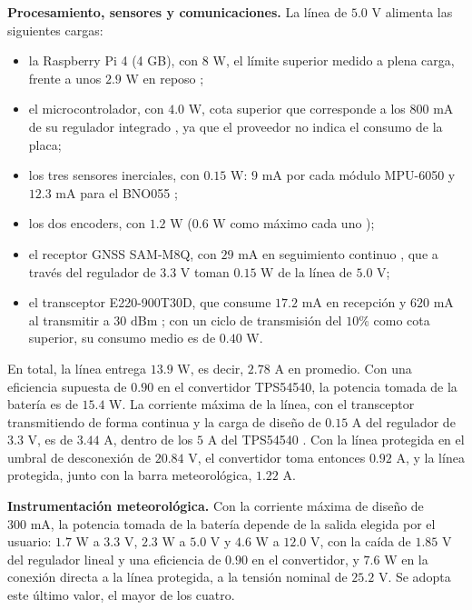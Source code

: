 \documentclass[../../General.tex]{subfiles}
\begin{document}
\textbf{Procesamiento, sensores y comunicaciones.} La línea de $5.0\text{ V}$ alimenta las siguientes cargas:
\begin{itemize}
    \item la Raspberry Pi 4 (4 GB), con $8\text{ W}$, el límite superior medido a plena carga, frente a unos $2.9\text{ W}$ en reposo \citep{raspberrytips_power};
    \item el microcontrolador, con $4.0\text{ W}$, cota superior que corresponde a los $800\text{ mA}$ de su regulador integrado \citep{naylamp_mega2560}, ya que el proveedor no indica el consumo de la placa;
    \item los tres sensores inerciales, con $0.15\text{ W}$: $9\text{ mA}$ por cada módulo MPU-6050 \citep{gy521_mpu6050} y $12.3\text{ mA}$ para el BNO055 \citep{bosch_bno055};
    \item los dos encoders, con $1.2\text{ W}$ ($0.6\text{ W}$ como máximo cada uno \citep{omron_e6b2});
    \item el receptor GNSS SAM-M8Q, con $29\text{ mA}$ en seguimiento continuo \citep{ublox_samm8q}, que a través del regulador de $3.3\text{ V}$ toman $0.15\text{ W}$ de la línea de $5.0\text{ V}$;
    \item el transceptor E220-900T30D, que consume $17.2\text{ mA}$ en recepción y $620\text{ mA}$ al transmitir a $30\text{ dBm}$ \citep{ebyte_e220_900t30d}; con un ciclo de transmisión del $10\%$ como cota superior, su consumo medio es de $0.40\text{ W}$.
\end{itemize}
En total, la línea entrega $13.9\text{ W}$, es decir, $2.78\text{ A}$ en promedio. Con una eficiencia supuesta de $0.90$ en el convertidor TPS54540, la potencia tomada de la batería es de $15.4\text{ W}$. La corriente máxima de la línea, con el transceptor transmitiendo de forma continua y la carga de diseño de $0.15\text{ A}$ del regulador de $3.3\text{ V}$, es de $3.44\text{ A}$, dentro de los $5\text{ A}$ del TPS54540 \citep{ti_tps54540}. Con la línea protegida en el umbral de desconexión de $20.84\text{ V}$, el convertidor toma entonces $0.92\text{ A}$, y la línea protegida, junto con la barra meteorológica, $1.22\text{ A}$.

\textbf{Instrumentación meteorológica.} Con la corriente máxima de diseño de $300\text{ mA}$, la potencia tomada de la batería depende de la salida elegida por el usuario: $1.7\text{ W}$ a $3.3\text{ V}$, $2.3\text{ W}$ a $5.0\text{ V}$ y $4.6\text{ W}$ a $12.0\text{ V}$, con la caída de $1.85\text{ V}$ del regulador lineal y una eficiencia de $0.90$ en el convertidor, y $7.6\text{ W}$ en la conexión directa a la línea protegida, a la tensión nominal de $25.2\text{ V}$. Se adopta este último valor, el mayor de los cuatro.
\end{document}
